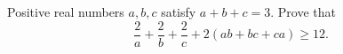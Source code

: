 Positive real numbers $a,b,c$ satisfy $a+b+c=3$. Prove that
\[
\dfrac{2}{a}+\dfrac{2}{b}+\dfrac{2}{c}+2(ab+bc+ca)\ge12 .
\]
